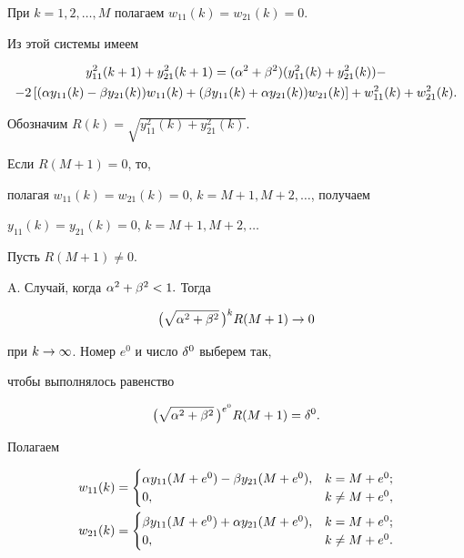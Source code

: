 При $k=1,2,\dotsc,M$ полагаем $w_{11}(k) = w_{21}(k) = 0$.


Из этой системы имеем


\begin{gather}


y_{11}^2(k+1) + y_{21}^2(k+1) =(\a^2 + \b^2)(y_{11}^2(k) +


y_{21}^2(k)) - \notag \\


%


- 2\left[(\a y_{11}(k)- \b y_{21}(k))w_{11}(k) +


(\b y_{11}(k)+ \a y_{21}(k))w_{21}(k)\right] + w_{11}^2(k) +


w_{21}^2(k).


\end{gather}


Обозначим $R(k) =\sqrt{y_{11}^2(k) + y_{21}^2(k)}$.


Если $R(M+1) = 0$, то,


полагая $w_{11}(k) = w_{21}(k) = 0$, $k =M+1,M+2,\dotsc$, получаем


$y_{11}(k) = y_{21}(k) = 0$, $k=M+1,M+2,\dotsc$





Пусть $R(M+1) \neq 0$.





A. Случай, когда $\alpha^2 + \beta^2 < 1. $ Тогда


$$


\big(\sqrt{\a^2+\b^2}\,\big)^kR(M+1) \R 0


$$


при $k \rightarrow \infty$. Номер $e^0 $ и число $\delta^0 $ выберем так,


чтобы выполнялось равенство


$$


\big(\sqrt{\a^2+\b^2}\,\big)^{e^0}R(M+1) = \d^0.


$$


Полагаем


\begin{align*}


w_{11}(k) &=


\begin{cases}


\a y_{11}(M+e^0) - \b y_{21}(M+e^0),& k= M+e^0; \\


0,& k \neq M+e^0,


\end{cases}


\\


%


w_{21}(k) &=


\begin{cases}


\b y_{11}(M+e^0) + \a y_{21}(M+e^0),& k= M+e^0; \\


0,& k \neq M+e^0.


\end{cases}


\end{align*}


